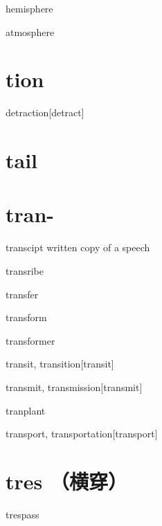 \begin{RefWord}{hemisphere}
\end{RefWord}

\begin{RefWord}{atmosphere}
\end{RefWord}

\section{tion}

\begin{RefWord}{detraction}[detract]
\end{RefWord}

\section{tail}



\section{tran-}

\begin{RefWord}{transcipt}
    written copy of a speech
\end{RefWord}

\begin{RefWord}{transribe}
\end{RefWord}

\begin{RefWord}{transfer}
\end{RefWord}

\begin{RefWord}{transform}
\end{RefWord}

\begin{RefWord}{transformer}
\end{RefWord}

\begin{RefWord}{transit, transition}[transit]
\end{RefWord}

\begin{RefWord}{transmit, transmission}[transmit]
\end{RefWord}

\begin{RefWord}{tranplant}
\end{RefWord}

\begin{RefWord}{transport, transportation}[transport]
\end{RefWord}

\section{tres （横穿）}

\begin{RefWord}{trespass}
\end{RefWord}